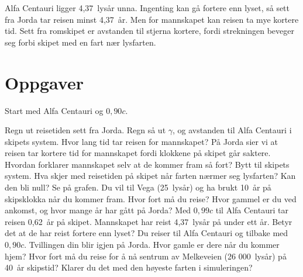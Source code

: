 \documentclass[11pt]{article}
\begin{document}

Alfa Centauri ligger 4,37~lysår unna. Ingenting kan gå fortere enn lyset, så sett fra Jorda tar reisen minst 4,37~år. Men for mannskapet kan reisen ta mye kortere tid. Sett fra romskipet er avstanden til stjerna kortere, fordi strekningen beveger seg forbi skipet med en fart nær lysfarten.

\section*{Oppgaver}

Start med Alfa Centauri og $0{,}90c$.

\begin{oppgaveliste}
\oppgave {}Regn ut reisetiden sett fra Jorda. Regn så ut $γ$, og avstanden til Alfa Centauri i skipets system. Hvor lang tid tar reisen for mannskapet?
\svar
\oppgave {}På Jorda sier vi at reisen tar kortere tid for mannskapet fordi klokkene på skipet går saktere. Hvordan forklarer mannskapet selv at de kommer fram så fort? Bytt til skipets system.
\svar
\oppgave {}Hva skjer med reisetiden på skipet når farten nærmer seg lysfarten? Kan den bli null? Se på grafen.
\svar
\oppgave {}Du vil til Vega (25~lysår) og ha brukt 10~år på skipsklokka når du kommer fram. Hvor fort må du reise? Hvor gammel er du ved ankomst, og hvor mange år har gått på Jorda?
\svar
\oppgave {}Med $0{,}99c$ til Alfa Centauri tar reisen 0,62~år på skipet. Mannskapet har reist 4,37~lysår på under ett år. Betyr det at de har reist fortere enn lyset?
\svar
\oppgave {}Du reiser til Alfa Centauri og tilbake med $0{,}90c$. Tvillingen din blir igjen på Jorda. Hvor gamle er dere når du kommer hjem?
\svar
\oppgave {}Hvor fort må du reise for å nå sentrum av Melkeveien (26 000~lysår) på 40~år skipstid? Klarer du det med den høyeste farten i simuleringen?
\svar
\end{oppgaveliste}
\end{document}
